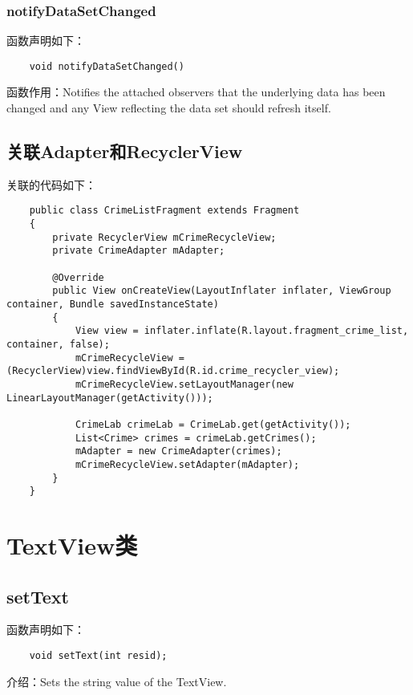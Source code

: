 \documentclass[a4paper,left=2.5cm,right=2.5cm,11pt]{article}
\begin{document}
\subsubsection{notifyDataSetChanged}
	函数声明如下：
	\begin{lstlisting}
	void notifyDataSetChanged()
	\end{lstlisting}

	函数作用：Notifies the attached observers that the underlying data has been changed and any View reflecting the data set should refresh itself.

\subsection{关联Adapter和RecyclerView}
	关联的代码如下：
	\begin{lstlisting}
	public class CrimeListFragment extends Fragment
	{
		private RecyclerView mCrimeRecycleView;
		private CrimeAdapter mAdapter;

		@Override
		public View onCreateView(LayoutInflater inflater, ViewGroup container, Bundle savedInstanceState)
		{
			View view = inflater.inflate(R.layout.fragment_crime_list, container, false);
			mCrimeRecycleView = (RecyclerView)view.findViewById(R.id.crime_recycler_view);
			mCrimeRecycleView.setLayoutManager(new LinearLayoutManager(getActivity()));

			CrimeLab crimeLab = CrimeLab.get(getActivity());
			List<Crime> crimes = crimeLab.getCrimes();
			mAdapter = new CrimeAdapter(crimes);
			mCrimeRecycleView.setAdapter(mAdapter);
		}
	}
	\end{lstlisting}

\section{TextView类}
\subsection{setText}
	函数声明如下：
	\begin{lstlisting}
	void setText(int resid);
	\end{lstlisting}

	介绍：Sets the string value of the TextView.
\end{document}
